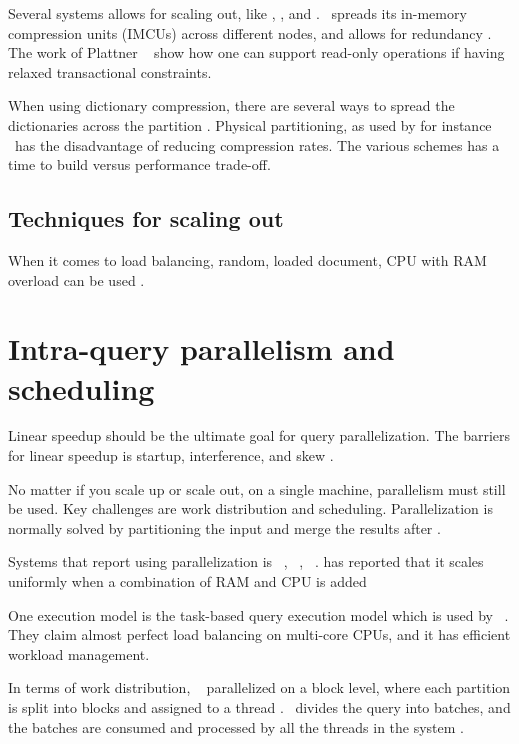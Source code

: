 Several systems allows for scaling out, like \cstore, \sapnw, and \saph. \oracle~spreads its in-memory compression units (IMCUs) across different nodes, and allows for redundancy \cite{Lahiri2015-mz}. The work of Plattner \ea~\cite{Plattner2014-fr} show how one can support read-only operations if having relaxed transactional constraints.

When using dictionary compression, there are several ways to spread the dictionaries across the partition \cite{Psaroudakis2015-lc}. Physical partitioning, as used by for instance \oracle~has the disadvantage of reducing compression rates. The various schemes has a time to build versus performance trade-off.

\subsection{Techniques for scaling out}
\label{sub:Techniques for scaling out}
When it comes to load balancing, random, loaded document, CPU with RAM overload can be used \cite{Qlik2012-ku}.


\section{Intra-query parallelism and scheduling}
\label{sec:Parallelism}
Linear speedup should be the ultimate goal for query parallelization. The barriers for linear speedup is startup, interference, and skew \cite{DeWitt1992-ki}.

No matter if you scale up or scale out, on a single machine, parallelism must still be used. Key challenges are work distribution and scheduling. Parallelization is normally solved by partitioning the input and merge the results after \cite{Neumann2011-uq}.

Systems that report using parallelization is \vertica~\cite{Lamb2012-kg}, \mssql~\cite{Larson2013-mc}, \blink~\cite{Barber2012-xt, Johnson2008-cp}. \qlikview has reported that it scales uniformly when a combination of RAM and CPU is added \cite{Qlik2011-yc}

One execution model is the task-based query execution model which is used by \hyrise~\cite{Swhalb2014-hn}. They claim almost perfect load balancing on multi-core CPUs, and it has efficient workload management.

In terms of work distribution, \blink~ parallelized on a block level, where each partition is split into blocks and assigned to a thread \cite{Johnson2008-cp, Barber2012-xt}. \mssql~divides the query into batches, and the batches are consumed and processed by all the threads in the system \cite{Larson2013-mc}. 


